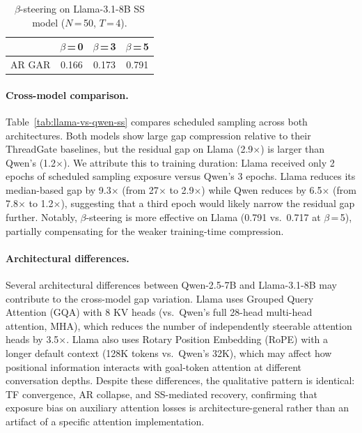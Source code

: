 \begin{table}[t]
\centering\small
\caption{$\beta$-steering on Llama-3.1-8B SS model ($N$\,=\,50, $T$\,=\,4).}
\label{tab:llama-ss-steering}
\begin{tabular}{@{}l ccc@{}}
\toprule
& $\beta$\,=\,0 & $\beta$\,=\,3 & $\beta$\,=\,5 \\
\midrule
AR GAR & 0.166 & 0.173 & 0.791 \\
\bottomrule
\end{tabular}
\end{table}

\paragraph{Cross-model comparison.}
Table~\ref{tab:llama-vs-qwen-ss} compares scheduled sampling across both architectures. Both models show large gap compression relative to their ThreadGate baselines, but the residual gap on Llama (2.9$\times$) is larger than Qwen's (1.2$\times$). We attribute this to training duration: Llama received only 2 epochs of scheduled sampling exposure versus Qwen's 3 epochs. Llama reduces its median-based gap by 9.3$\times$ (from 27$\times$ to 2.9$\times$) while Qwen reduces by 6.5$\times$ (from 7.8$\times$ to 1.2$\times$), suggesting that a third epoch would likely narrow the residual gap further. Notably, $\beta$-steering is more effective on Llama (0.791 vs.\ 0.717 at $\beta$\,=\,5), partially compensating for the weaker training-time compression.

\paragraph{Architectural differences.}
Several architectural differences between Qwen-2.5-7B and Llama-3.1-8B may contribute to the cross-model gap variation. Llama uses Grouped Query Attention (GQA) with 8 KV heads (vs.\ Qwen's full 28-head multi-head attention, MHA), which reduces the number of independently steerable attention heads by 3.5$\times$. Llama also uses Rotary Position Embedding (RoPE) with a longer default context (128K tokens vs.\ Qwen's 32K), which may affect how positional information interacts with goal-token attention at different conversation depths. Despite these differences, the qualitative pattern is identical: TF convergence, AR collapse, and SS-mediated recovery, confirming that exposure bias on auxiliary attention losses is architecture-general rather than an artifact of a specific attention implementation.


